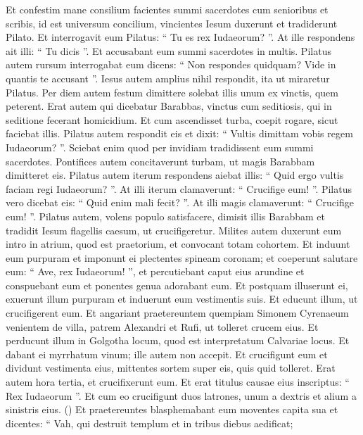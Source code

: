 \begin{biblechapter}
\begin{biblechapter}
\begin{biblechapter}
\begin{biblechapter}
\begin{biblechapter}
\begin{biblechapter}
\begin{biblechapter}
\begin{biblechapter}
\begin{biblechapter}
\begin{biblechapter}
\begin{biblechapter}
\begin{biblechapter}
\begin{biblechapter}
\begin{biblechapter}
\begin{biblechapter}
\verse Et confestim mane consilium facientes summi sacerdotes cum senioribus et scribis, id est universum concilium, vincientes Iesum duxerunt et tradiderunt Pilato. 
\verse Et interrogavit eum Pilatus: “ Tu es rex Iudaeorum? ”. At ille respondens ait illi: “ Tu dicis ”. 
\verse Et accusabant eum summi sacerdotes in multis. 
\verse Pilatus autem rursum interrogabat eum dicens: “ Non respondes quidquam? Vide in quantis te accusant ”. 
\verse Iesus autem amplius nihil respondit, ita ut miraretur Pilatus.
 \verse Per diem autem festum dimittere solebat illis unum ex vinctis, quem peterent. 
\verse Erat autem qui dicebatur Barabbas, vinctus cum seditiosis, qui in seditione fecerant homicidium. 
\verse Et cum ascendisset turba, coepit rogare, sicut faciebat illis. 
\verse Pilatus autem respondit eis et dixit: “ Vultis dimittam vobis regem Iudaeorum? ”. 
\verse Sciebat enim quod per invidiam tradidissent eum summi sacerdotes. 
\verse Pontifices autem concitaverunt turbam, ut magis Barabbam dimitteret eis. 
\verse Pilatus autem iterum respondens aiebat illis: “ Quid ergo vultis faciam regi Iudaeorum? ”. 
\verse At illi iterum clamaverunt: “ Crucifige eum! ”. 
\verse Pilatus vero dicebat eis: “ Quid enim mali fecit? ”. At illi magis clamaverunt: “ Crucifige eum! ”. 
\verse Pilatus autem, volens populo satisfacere, dimisit illis Barabbam et tradidit Iesum flagellis caesum, ut crucifigeretur.
 \verse Milites autem duxerunt eum intro in atrium, quod est praetorium, et convocant totam cohortem. 
\verse Et induunt eum purpuram et imponunt ei plectentes spineam coronam; 
\verse et coeperunt salutare eum: “ Ave, rex Iudaeorum! ”, 
\verse et percutiebant caput eius arundine et conspuebant eum et ponentes genua adorabant eum. 
\verse Et postquam illuserunt ei, exuerunt illum purpuram et induerunt eum vestimentis suis. Et educunt illum, ut crucifigerent eum.
 \verse Et angariant praetereuntem quempiam Simonem Cyrenaeum venientem de villa, patrem Alexandri et Rufi, ut tolleret crucem eius. 
\verse Et perducunt illum in Golgotha locum, quod est interpretatum Calvariae locus. 
\verse Et dabant ei myrrhatum vinum; ille autem non accepit.
 \verse Et crucifigunt eum et dividunt vestimenta eius, mittentes sortem super eis, quis quid tolleret. 
\verse Erat autem hora tertia, et crucifixerunt eum. 
\verse Et erat titulus causae eius inscriptus: “ Rex Iudaeorum ”. 
\verse Et cum eo crucifigunt duos latrones, unum a dextris et alium a
 sinistris eius. 
(\verse) \verse Et praetereuntes blasphemabant eum moventes capita sua et dicentes: “ Vah, qui destruit templum et in tribus diebus aedificat; 

\end{biblechapter}
\end{biblechapter}
\end{biblechapter}
\end{biblechapter}
\end{biblechapter}
\end{biblechapter}
\end{biblechapter}
\end{biblechapter}
\end{biblechapter}
\end{biblechapter}
\end{biblechapter}
\end{biblechapter}
\end{biblechapter}
\end{biblechapter}
\end{biblechapter}
